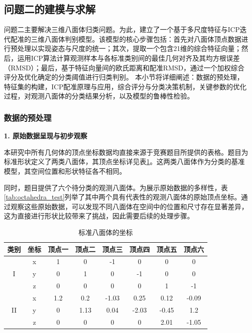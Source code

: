 \subsection{问题二的建模与求解}
问题二主要解决三维八面体归类问题。为此，建立了一个基于多尺度特征与ICP迭代配准的三维八面体判别模型。该模型的核心步骤包括：首先对八面体顶点数据进行预处理以实现姿态与尺度的统一；其次，提取一个包含21维的综合特征向量；然后，运用ICP算法计算观测样本与各标准类别间的最佳几何对齐及其均方根误差（RMSD）；最后，基于特征向量间的欧氏距离和配准RMSD，通过一个加权综合评分及优化确定的分类阈值进行归类判别。
本小节将详细阐述：数据的预处理，特征集的构建，ICP配准原理与应用，综合评分与分类决策机制，关键参数的优化过程，对观测八面体的分类结果分析，以及模型的鲁棒性检验。

\subsubsection{数据的预处理}
    \textbf{1. 原始数据呈现与初步观察}
    
    本研究中所有几何体的顶点坐标数据均直接来源于竞赛题目所提供的表格。题目为标准形状定义了两类八面体，其顶点坐标详见表\ref{tab:octahedra_std}。这两类八面体作为分类的基准模型，其空间位置和形状特征各不相同。
    
    同时，题目提供了六个待分类的观测八面体。为展示原始数据的多样性，表\ref{tab:octahedra_test}列举了其中两个具有代表性的观测八面体的原始顶点坐标。通过观察这些原始数据，可以发现不同八面体在空间中的位置和尺寸存在显著差异，这为直接进行形状比较带来了挑战，因此需要后续的处理步骤。
    
   \begin{table}[H]
\centering
\caption{标准八面体的坐标}
\label{tab:octahedra_std}
\begin{tabular}{|c|c|c|c|c|c|c|c|} 
\hline
类别                  & 坐标 & 顶点一 & 顶点二  & 顶点三   & 顶点四   & 顶点五   & 顶点六    \\ 
\hline
\multirow{3}{*}{I}  & x  & 1   & 0    & -1    & 0     & 0     & 0      \\ 
\cline{2-8}
                    & y  & 0   & 1    & 0     & -1    & 0     & 0      \\ 
\cline{2-8}
                    & z  & 0   & 0    & 0     & 0     & 1     & -1     \\ 
\hline
\multirow{3}{*}{II} & x  & 1.2 & 0.2  & -1.03 & 0.25  & 0.12  & -0.09  \\ 
\cline{2-8}
                    & y  & 0   & 1.13 & 0.04  & -2.03 & -0.45 & 1.2    \\ 
\cline{2-8}
                    & z  & 0   & 0    & 0     & 0     & 2.01  & -1.05  \\
\hline
\end{tabular}
\end{table}

